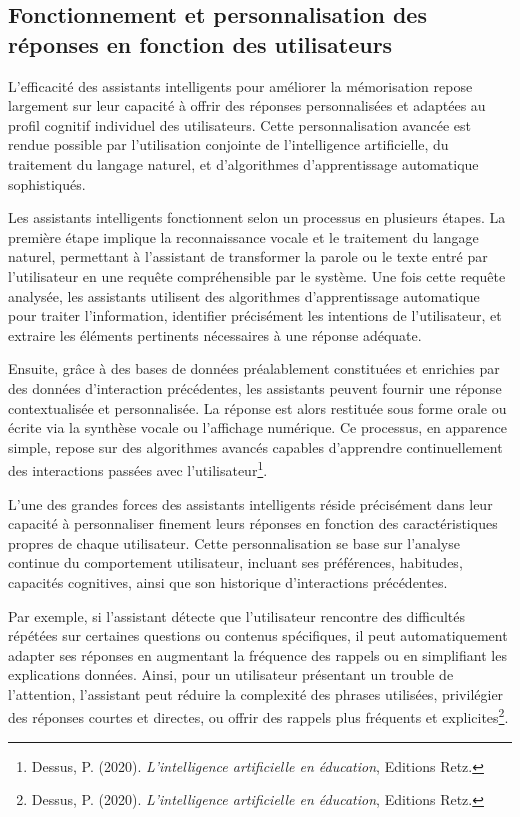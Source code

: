 \documentclass[12pt,a4paper]{report}
\begin{document}
\subsection{Fonctionnement et personnalisation des réponses en fonction des utilisateurs}

L’efficacité des assistants intelligents pour améliorer la mémorisation repose largement sur leur capacité à offrir des réponses personnalisées et adaptées au profil cognitif individuel des utilisateurs. Cette personnalisation avancée est rendue possible par l’utilisation conjointe de l’intelligence artificielle, du traitement du langage naturel, et d’algorithmes d’apprentissage automatique sophistiqués.

Les assistants intelligents fonctionnent selon un processus en plusieurs étapes. La première étape implique la reconnaissance vocale et le traitement du langage naturel, permettant à l’assistant de transformer la parole ou le texte entré par l’utilisateur en une requête compréhensible par le système. Une fois cette requête analysée, les assistants utilisent des algorithmes d’apprentissage automatique pour traiter l'information, identifier précisément les intentions de l’utilisateur, et extraire les éléments pertinents nécessaires à une réponse adéquate.

Ensuite, grâce à des bases de données préalablement constituées et enrichies par des données d’interaction précédentes, les assistants peuvent fournir une réponse contextualisée et personnalisée. La réponse est alors restituée sous forme orale ou écrite via la synthèse vocale ou l’affichage numérique. Ce processus, en apparence simple, repose sur des algorithmes avancés capables d’apprendre continuellement des interactions passées avec l’utilisateur\footnote{Dessus, P. (2020). \textit{L'intelligence artificielle en éducation}, Editions Retz.}.

L’une des grandes forces des assistants intelligents réside précisément dans leur capacité à personnaliser finement leurs réponses en fonction des caractéristiques propres de chaque utilisateur. Cette personnalisation se base sur l’analyse continue du comportement utilisateur, incluant ses préférences, habitudes, capacités cognitives, ainsi que son historique d’interactions précédentes.

Par exemple, si l'assistant détecte que l'utilisateur rencontre des difficultés répétées sur certaines questions ou contenus spécifiques, il peut automatiquement adapter ses réponses en augmentant la fréquence des rappels ou en simplifiant les explications données. Ainsi, pour un utilisateur présentant un trouble de l’attention, l’assistant peut réduire la complexité des phrases utilisées, privilégier des réponses courtes et directes, ou offrir des rappels plus fréquents et explicites\footnote{Dessus, P. (2020). \textit{L’intelligence artificielle en éducation}, Editions Retz.}.
\end{document}
